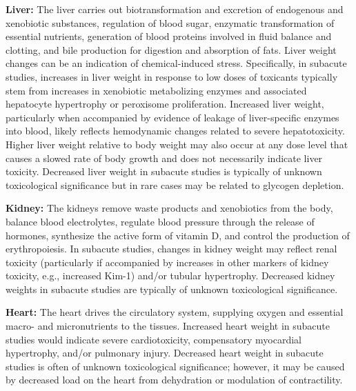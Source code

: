 \noindent\textbf{Liver:} The liver carries out biotransformation and excretion of endogenous and xenobiotic substances, regulation of blood sugar, enzymatic transformation of essential nutrients, generation of blood proteins involved in fluid balance and clotting, and bile production for digestion and absorption of fats. Liver weight changes can be an indication of chemical-induced stress. Specifically, in subacute studies, increases in liver weight in response to low doses of toxicants typically stem from increases in xenobiotic metabolizing enzymes and associated hepatocyte hypertrophy or peroxisome proliferation. Increased liver weight, particularly when accompanied by evidence of leakage of liver-specific enzymes into blood, likely reflects hemodynamic changes related to severe hepatotoxicity. Higher liver weight relative to body weight may also occur at any dose level that causes a slowed rate of body growth and does not necessarily indicate liver toxicity. Decreased liver weight in subacute studies is typically of unknown toxicological significance but in rare cases may be related to glycogen depletion.

\noindent\textbf{Kidney:} The kidneys remove waste products and xenobiotics from the body, balance blood electrolytes, regulate blood pressure through the release of hormones, synthesize the active form of vitamin D, and control the production of erythropoiesis. In subacute studies, changes in kidney weight may reflect renal toxicity (particularly if accompanied by increases in other markers of kidney toxicity, e.g., increased Kim-1) and/or tubular hypertrophy. Decreased kidney weights in subacute studies are typically of unknown toxicological significance.

\noindent\textbf{Heart:} The heart drives the circulatory system, supplying oxygen and essential macro- and micronutrients to the tissues. Increased heart weight in subacute studies would indicate severe cardiotoxicity, compensatory myocardial hypertrophy, and/or pulmonary injury. Decreased heart weight in subacute studies is often of unknown toxicological significance; however, it may be caused by decreased load on the heart from dehydration or modulation of contractility.
